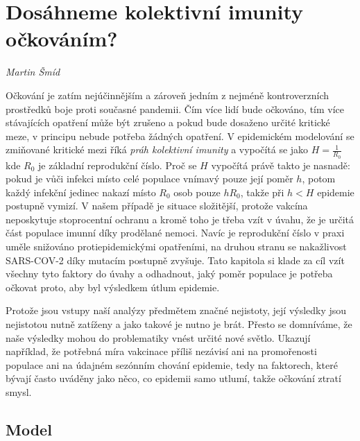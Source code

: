 
\chapter{Dosáhneme kolektivní imunity očkováním?}

\textit{Martin Šmíd}
\vspace{15mm}

Očkování je zatím nejúčinnějším a zároveň jedním z nejméně kontroverzních
prostředků boje proti současné pandemii. Čím více lidí bude očkováno,
tím více stávajících opatření může být zrušeno a pokud bude dosaženo určité kritické
meze, v principu nebude potřeba žádných opatření. V epidemickém modelování se zmiňované kritické mezi říká {\em práh kolektivní imunity} a vypočítá se jako $H=\frac{1}{R_0}$ kde $R_0$ je základní reprodukční číslo. Proč se $H$ vypočítá právě takto je nasnadě: pokud je vůči infekci místo celé populace vnímavý pouze její poměr $h$, potom každý infekční jedinec nakazí místo $R_0$ osob pouze $h R_0$, takže při $h < H$ epidemie postupně vymizí. V našem případě je situace složitější, protože vakcína neposkytuje stoprocentní ochranu a kromě toho je třeba vzít v úvahu, že je určitá část populace imunní díky prodělané nemoci. Navíc je reprodukční číslo v praxi uměle snižováno protiepidemickými opatřeními, na druhou stranu se nakažlivost SARS-COV-2 díky mutacím postupně zvyšuje. Tato kapitola si klade za cíl vzít všechny tyto faktory do úvahy a odhadnout, jaký poměr populace je potřeba očkovat proto, aby byl výsledkem útlum epidemie.

Protože jsou vstupy naší analýzy předmětem značné nejistoty, její výsledky jsou nejistotou nutně zatíženy a jako takové je nutno je brát. Přesto se domníváme, že naše výsledky mohou do problematiky vnést určité nové světlo. Ukazují například, že potřebná míra vakcinace příliš nezávisí
ani na promořenosti populace ani na údajném sezónním chování epidemie,
tedy na faktorech, které bývají často uváděny jako něco, co epidemii samo utlumí, takže očkování ztratí smysl.

\section*{Model}

